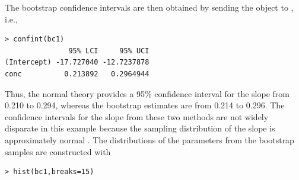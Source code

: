 \documentclass[10pt,openany]{book}\usepackage[]{graphicx}\usepackage[]{color}
\makeatletter
\newenvironment{kframe}{%
 \def\at@end@of@kframe{}%
 \ifinner\ifhmode%
  \def\at@end@of@kframe{\end{minipage}}%
  \begin{minipage}{\columnwidth}%
 \fi\fi%
 \def\FrameCommand##1{\hskip\@totalleftmargin \hskip-\fboxsep
 \colorbox{shadecolor}{##1}\hskip-\fboxsep
     \hskip-\linewidth \hskip-\@totalleftmargin \hskip\columnwidth}%
 \MakeFramed {\advance\hsize-\width
   \@totalleftmargin\z@ \linewidth\hsize
   \@setminipage}}%
 {\par\unskip\endMakeFramed%
 \at@end@of@kframe}
\newenvironment{knitrout}{}{} %
\makeatother
\begin{document}
The bootstrap confidence intervals are then obtained by sending the  object to , i.e.,
\begin{knitrout}
\color{fgcolor}\begin{kframe}
\begin{verbatim}
> confint(bc1)
               95% LCI     95% UCI
(Intercept) -17.727040 -12.7237878
conc          0.213892   0.2964944
\end{verbatim}
\end{kframe}
\end{knitrout}

Thus, the normal theory provides a 95\% confidence interval for the slope from 0.210 to 0.294, whereas the bootstrap estimates are from 0.214 to 0.296.  The confidence intervals for the slope from these two methods are not widely disparate in this example because the sampling distribution of the slope is approximately normal .  The distributions of the parameters from the bootstrap samples  are constructed with

\begin{knitrout}
\color{fgcolor}\begin{kframe}
\begin{verbatim}
> hist(bc1,breaks=15)
\end{verbatim}


{\ttfamily\noindent\bfseries\color{errorcolor}{Error in int\_abline(a = a, b = b, h = h, v = v, untf = untf, ...): plot.new has not been called yet}}\end{kframe}
\end{knitrout}
\end{document}
